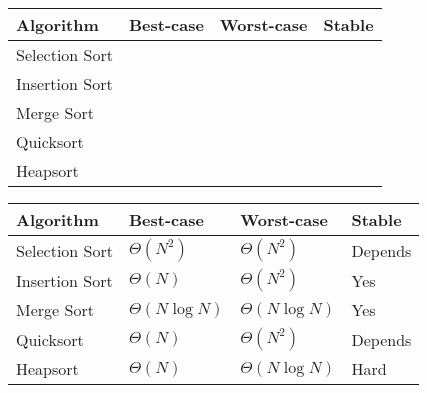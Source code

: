 \ifprintanswers\else
{
\renewcommand{\arraystretch}{2}
\setlength{\tabcolsep}{12pt}
\begin{tabularx}{\textwidth}{Xlll}
Algorithm         & Best-case & Worst-case & Stable \\\hline
Selection Sort    &           &            &        \\
Insertion Sort    &           &            &        \\
Merge Sort        &           &            &        \\
Quicksort         &           &            &        \\
Heapsort          &           &            &        
\end{tabularx}
}
\fi

\begin{solution}
{
\renewcommand{\arraystretch}{2}
\setlength{\tabcolsep}{12pt}
\begin{tabularx}{\textwidth}{Xlll}
Algorithm         & Best-case          & Worst-case          & Stable \\\hline
Selection Sort    & $\Theta(N^2)$      & $\Theta(N^2)$       & Depends\\
Insertion Sort    & $\Theta(N)$        & $\Theta(N^2)$       & Yes    \\
Merge Sort        & $\Theta(N \log N)$ & $\Theta(N \log N)$  & Yes    \\
Quicksort         & $\Theta(N)$        & $\Theta(N^2)$       & Depends\\
Heapsort          & $\Theta(N)$        & $\Theta(N \log N)$  & Hard
\end{tabularx}
}
\end{solution}

\vspace{\parskip}